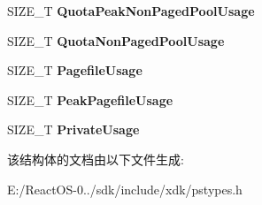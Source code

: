 \begin{DoxyCompactItemize}
\mbox{\label{struct___v_m___c_o_u_n_t_e_r_s___e_x_a35026dff280c44a28f833881989017c9}} 
S\+I\+Z\+E\+\_\+T {\bfseries Quota\+Peak\+Non\+Paged\+Pool\+Usage}
\item 
\mbox{\label{struct___v_m___c_o_u_n_t_e_r_s___e_x_a0898059d0be1ce8ca56f9b4a51a9d0b1}} 
S\+I\+Z\+E\+\_\+T {\bfseries Quota\+Non\+Paged\+Pool\+Usage}
\item 
\mbox{\label{struct___v_m___c_o_u_n_t_e_r_s___e_x_a79c50953c5308cc6850b48379c759827}} 
S\+I\+Z\+E\+\_\+T {\bfseries Pagefile\+Usage}
\item 
\mbox{\label{struct___v_m___c_o_u_n_t_e_r_s___e_x_ad7469d618dbab4ee97a53c679174a136}} 
S\+I\+Z\+E\+\_\+T {\bfseries Peak\+Pagefile\+Usage}
\item 
\mbox{\label{struct___v_m___c_o_u_n_t_e_r_s___e_x_a85957fad054787afef4ad725b96e36c4}} 
S\+I\+Z\+E\+\_\+T {\bfseries Private\+Usage}
\end{DoxyCompactItemize}


该结构体的文档由以下文件生成\+:\begin{DoxyCompactItemize}
\item 
E\+:/\+React\+O\+S-\/0../sdk/include/xdk/pstypes.\+h\end{DoxyCompactItemize}
